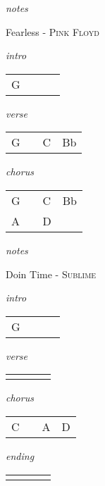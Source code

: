 \documentclass[12pt]{article}
\begin{document}
\textit{notes}

\newpage

{\Huge Fearless} {\huge - \textsc{Pink Floyd}}

\huge
\textit{intro}

\begin{tabular}{|P{1.25in}|P{1.25in}|P{1.25in}|P{1.25in}|}
  G  &   &   &   \\
\end{tabular}

\textit{verse}

\begin{tabular}{|P{1.25in}|P{1.25in}|P{1.25in}|P{1.25in}|}
  G  &   & C  &  Bb \\
\end{tabular}

\textit{chorus}

\begin{tabular}{|P{1.25in}|P{1.25in}|P{1.25in}|P{1.25in}|}
  G  &   &  C & Bb  \\
  A  &   &  D  &  \\
\end{tabular}

\textit{notes}

\newpage

{\Huge Doin Time} {\huge - \textsc{Sublime}}

\huge
\textit{intro}

\begin{tabular}{|P{1.25in}|P{1.25in}|P{1.25in}|P{1.25in}|}
  G  &   &   &   \\
\end{tabular}

\textit{verse}

\begin{tabular}{|P{1.25in}|P{1.25in}|P{1.25in}|P{1.25in}|}
    &   &   &   \\
\end{tabular}

\textit{chorus}

\begin{tabular}{|P{1.25in}|P{1.25in}|P{1.25in}|P{1.25in}|}
  C  &   & A  &  D \\
\end{tabular}

\textit{ending}

\begin{tabular}{|P{1.25in}|P{1.25in}|P{1.25in}|P{1.25in}|}
    &   &   &   \\
\end{tabular}
\end{document}
